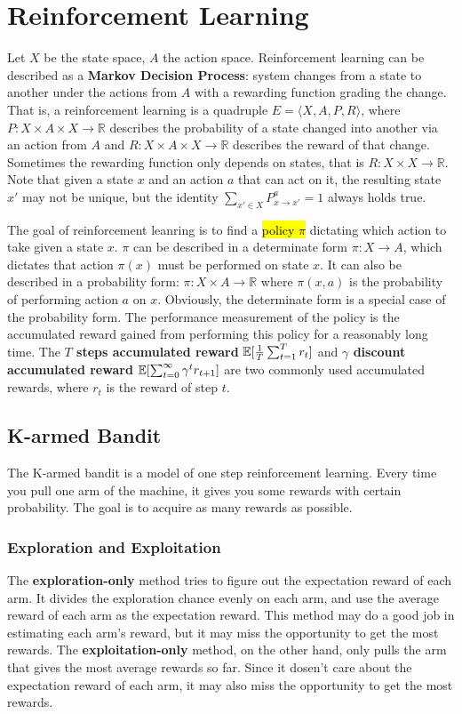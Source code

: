 \section{Reinforcement Learning}

Let $X$ be the state space, $A$ the action space. Reinforcement learning can be described as a
\textbf{Markov Decision Process}: system changes from a state to another under the actions from $A$ with a 
rewarding function grading the change. That is, a reinforcement learning is a quadruple $E = \langle X, A, P,
R\rangle$, where $P: X \times A \times X \longrightarrow \mathbb{R}$ describes the probability of a state
changed into another via an action from $A$ and $R: X \times A \times X \longrightarrow \mathbb{R}$ describes
the reward of that change. Sometimes the rewarding function only depends on states, that is $R: X \times X
\longrightarrow \mathbb{R}$. Note that given a state $x$ and an action $a$ that can act on it, the resulting 
state $x'$ may not be unique, but the identity $\sum_{x'\in X}P_{x\rightarrow x'}^a = 1$ always holds true.
\par
The goal of reinforcement leanring is to find a \hl{policy $\pi$} dictating which action to take given a state
$x$. $\pi$ can be described in a determinate form $\pi: X \longrightarrow A$, which dictates that action
$\pi(x)$ must be performed on state $x$. It can also be described in a probability form: $\pi: X \times A
\longrightarrow \mathbb{R}$ where $\pi(x, a)$ is the probability of performing action $a$ on $x$. Obviously,
the determinate form is a special case of the probability form. The performance measurement of the policy is 
the accumulated reward gained from performing this policy for a reasonably long time. The \textbf{$T$ steps
accumulated reward} $\operatorname*{\mathbb{E}}[\frac{1}{T}\sum_{t=1}^{T}r_t]$ and \textbf{$\gamma$ discount accumulated reward}
$\operatorname*{\mathbb{E}}[\sum_{t=0}^{\infty}\gamma^t r_{t+1}]$ are two commonly used accumulated rewards, where $r_t$ is the reward
of step $t$.

\subsection{K-armed Bandit}
The K-armed bandit is a model of one step reinforcement learning. Every time you pull one arm of the machine,
it gives you some rewards with certain probability. The goal is to acquire as many rewards as possible.

\subsubsection{Exploration and Exploitation}
The \textbf{exploration-only} method tries to figure out the expectation reward of each arm. It divides the 
exploration chance evenly on each arm, and use the average reward of each arm as the expectation reward. This
method may do a good job in estimating each arm's reward, but it may miss the opportunity to get the most 
rewards. The \textbf{exploitation-only} method, on the other hand, only pulls the arm that gives the most 
average rewards so far. Since it dosen't care about the expectation reward of each arm, it may also miss the
opportunity to get the most rewards. 


